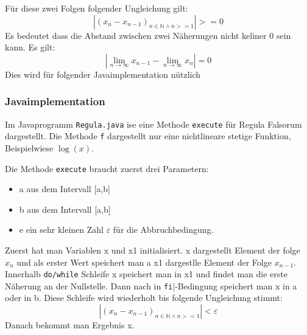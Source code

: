 Für diese zwei Folgen folgender Ungleichung gilt:
$$|(x_n -x_{ n - 1})_{n \in \mathbb{N} \wedge  n >= 1}| >= 0$$
Es bedeutet dass die Abstand zwischen zwei Näherungen nicht keliner 0 sein kann. Es gilt:
$$|\lim_{n \to \infty}x_{n-1} - \lim_{n \to \infty}x_n| = 0$$
Dies wird für folgender Javaimplementation nützlich

\subsubsection{Javaimplementation}
Im Javaprogramm  \verb|Regula.java| ise eine Methode \verb|execute| für Regula Falsorum dargestellt.
Die Methode \verb|f| dargestellt nur eine nichtlineare stetige Funktion, Beispielwiese $\log(x)$.

Die Methode \verb|execute| braucht zuerst drei Parametern:

\begin{itemize}
\item a aus dem Intervall [a,b]
\item b aus dem Intervall [a,b]
\item e ein sehr kleinen Zahl $\varepsilon$ für die Abbruchbedingung.
\end{itemize} 
Zuerst hat man Variablen x und x1 initialisiert.
x dargestellt Element der folge $x_n$ und als erster Wert speichert man a 
x1 dargestlle Element der Folge $x_{n-1}$.
Innerhalb  \verb|do/while| Schleife x speichert man in x1 und findet man die erste Näherung an der Nullstelle.
Dann nach in \verb|fi||-Bedingung speichert man x in a oder in b.
Diese Schleife wird wiederholt bis folgende Ungleichung stimmt:
$$|(x_n -x_{ n - 1})_{n \in \mathbb{N} \wedge  n >= 1}| < \varepsilon$$
Danach bekommt man Ergebnis x.



 


